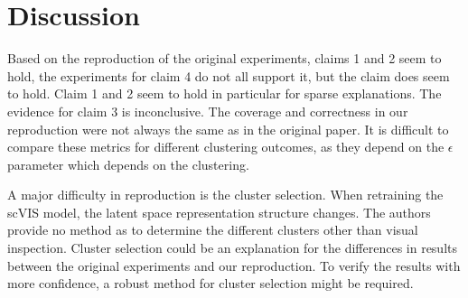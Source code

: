 \section{Discussion}
Based on the reproduction of the original experiments, claims 1 and 2 seem to hold, the experiments for claim 4 do not all support it, but the claim does seem to hold. Claim 1 and 2 seem to hold in particular for sparse explanations. The evidence for claim 3 is inconclusive. The coverage and correctness in our reproduction were not always the same as in the original paper. It is difficult to compare these metrics for different clustering outcomes, as they depend on the $\epsilon$ parameter which depends on the clustering.

A major difficulty in reproduction is the cluster selection. When retraining the scVIS model, the latent space representation structure changes. The authors provide no method as to determine the different clusters other than visual inspection. Cluster selection could be an explanation for the differences in results between the original experiments and our reproduction. To verify the results with more confidence, a robust method for cluster selection might be required. 






